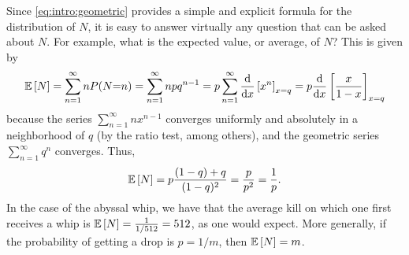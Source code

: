 \documentclass[letterpaper]{article}
\begin{document}
	Since \eqref{eq:intro:geometric} provides a simple and explicit formula for the distribution of $N$, it is easy to answer virtually any question that can be asked about $N$. For example, what is the expected value, or average, of $N$? This is given by
	\begin{equation}
		\mathbb{E}\left[N\right] = \sum_{n=1}^\infty nP(N{=}n) = \sum_{n=1}^\infty npq^{n-1} = p \sum_{n=1}^\infty \frac{\text{d}}{\text{d}x}\left[x^n\right]_{x{=}q} = p\frac{\text{d}}{\text{d}x}\left[\frac{x}{1-x}\right]_{x{=}q}
	\end{equation}
	because the series $\sum\limits_{n=1}^\infty nx^{n-1}$ converges uniformly and absolutely in a neighborhood of $q$ (by the ratio test, among others), and the geometric series $\sum\limits_{n=1}^\infty q^n$ converges. Thus,
	\begin{equation}
		\mathbb{E}\left[N\right] = p\frac{(1-q) +q}{(1-q)^2} = \frac{p}{p^2} = \frac{1}{p}.
	\end{equation}
	In the case of the abyssal whip, we have that the average kill on which one first receives a whip is $\mathbb{E}\left[N\right] = \frac{1}{1/512} = 512$, as one would expect. More generally, if the probability of getting a drop is $p =1/m$, then $\mathbb{E}\left[N\right] = m$.
	
\end{document}
